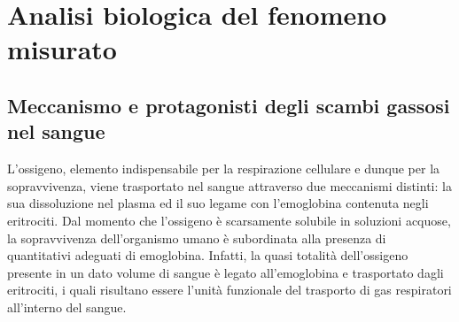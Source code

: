 \documentclass[12pt,a4paper, twoside, openright]{report}
\begin{document}
\section{Analisi biologica del fenomeno misurato}


\subsection{Meccanismo e protagonisti degli scambi gassosi nel sangue}

L'ossigeno, elemento indispensabile per la respirazione cellulare e dunque per la sopravvivenza, viene trasportato nel sangue attraverso due meccanismi distinti: la sua dissoluzione nel plasma ed il suo legame con l'emoglobina contenuta negli eritrociti. 
Dal momento che l'ossigeno è scarsamente solubile in soluzioni acquose, la sopravvivenza dell'organismo umano è subordinata alla presenza di quantitativi adeguati di emoglobina. 
Infatti, la quasi totalità dell'ossigeno presente in un dato volume di sangue è legato all'emoglobina e trasportato dagli eritrociti, i quali risultano essere l’unità funzionale del trasporto di gas respiratori all’interno del sangue.
\newline
\end{document}
